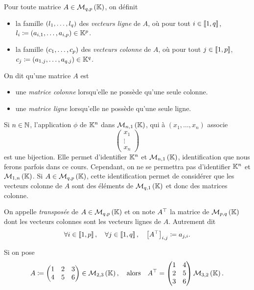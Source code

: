 \documentclass{magnolia}
\begin{document}
\begin{definition}[utile=-3]
Pour toute matrice $A\in\mathcal{M}_{q,p}\left(\mathbb{K}\right)$, on définit
\begin{itemize}
\item la famille $\left(l_1,\ldots,l_q\right)$ des \emph{vecteurs ligne} de $A$, où pour tout
  $i\in\left\llbracket 1,q\right\rrbracket$, $l_i\coloneqq\left(a_{i,1},\ldots,a_{i,p}\right)\in\mathbb{K}^p$.
\item la famille $\left(c_1,\ldots,c_p\right)$ des \emph{vecteurs colonne} de $A$, où pour tout
  $j\in\left\llbracket 1,p\right\rrbracket$, $c_j\coloneqq\left(a_{1,j},\ldots,a_{q,j}\right)\in\mathbb{K}^q$.
\end{itemize}
\end{definition}

\begin{definition}[utile=-3]
On dit qu'une matrice $A$ est
\begin{itemize}
\item une \emph{matrice colonne} lorsqu'elle ne possède qu'une seule colonne.
\item une \emph{matrice ligne} lorsqu'elle ne possède qu'une seule ligne.
\end{itemize}
\end{definition}

\begin{remarqueUnique}
\remarque Si $n\in\mathbb{N}$, l'application $\phi$ de $\mathbb{K}^n$ dans $\mathcal{M}_{n,1}\left(\mathbb{K}\right)$, qui à
  $(x_1,\ldots,x_n)$ associe
  \[\begin{pmatrix}
    x_1\\
    \vdots\\
    x_n
  \end{pmatrix}\]
  est une bijection. Elle permet d'identifier $\mathbb{K}^n$ et $\mathcal{M}_{n,1}\left(\mathbb{K}\right)$, identification
  que nous ferons parfois dans ce cours. Cependant, on
  ne se permettra pas d'identifier $\mathbb{K}^n$ et $\mathcal{M}_{1,n}\left(\mathbb{K}\right)$.
\remarque Si $A\in\mathcal{M}_{q,p}\left(\mathbb{K}\right)$, cette identification permet de considérer que les vecteurs
  colonne de $A$ sont des éléments de $\mathcal{M}_{q,1}\left(\mathbb{K}\right)$ et donc des matrices colonne. 
\end{remarqueUnique}

\begin{definition}[utile=-3]
On appelle \emph{transposée} de $A\in\mathcal{M}_{q,p}\left(\mathbb{K}\right)$ et on note ${A}^{\top}$
la matrice de $\mathcal{M}_{p,q}\left(\mathbb{K}\right)$ dont les vecteurs colonnes sont les vecteurs
lignes de $A$. Autrement dit
\[\forall i\in\left\llbracket 1,p\right\rrbracket ,\quad \forall j\in\left\llbracket 1,q\right\rrbracket ,\quad
  \left[{A}^{\top}\right]_{i,j}\coloneqq a_{j,i}.\]
\end{definition}

\begin{exempleUnique}
\exemple Si on pose
  \[A\coloneqq
    \begin{pmatrix}
    1 & 2 & 3\\
    4 & 5 & 6
    \end{pmatrix}\in\mathcal{M}_{2,3}\left(\mathbb{K}\right), \quad\text{alors}\quad
    {A}^{\top}=
    \begin{pmatrix}
    1 & 4\\
    2 & 5\\
    3 & 6
    \end{pmatrix}\mathcal{M}_{3,2}\left(\mathbb{K}\right).\]
\end{exempleUnique}
\end{document}

